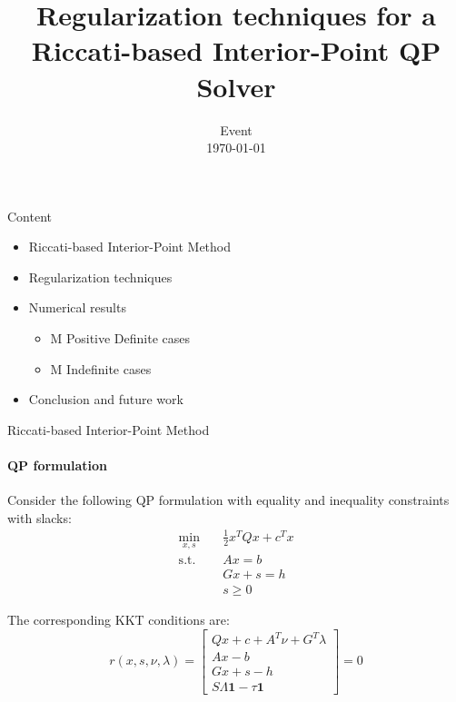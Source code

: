 \documentclass[10pt,aspectratio=1610]{beamer} %
\title[Regularization techniques for a Riccati-based Interior-Point QP Solver]{\huge Regularization techniques for a Riccati-based Interior-Point QP Solver}
\institute{Systems Control and Optimization Laboratory (syscop)}
\date[\today]{Event \\ \today }
\begin{document}
\InsertTitle

\begin{frame}{Content}

	\begin{itemize}
		\item Riccati-based Interior-Point Method
		\item Regularization techniques 
		\item Numerical results
		\begin{itemize}
			\item M Positive Definite cases
			\item M Indefinite cases
		\end{itemize}
		\item Conclusion and future work
	\end{itemize}

\end{frame}

\begin{frame}{Riccati-based Interior-Point Method}
    \framesubtitle{QP formulation}
    Consider the following QP formulation with equality and inequality constraints with slacks:
    \begin{equation}
        \begin{aligned}
            \min_{x, s} \quad & \frac{1}{2} x^T Q x + c^T x \\
            \text{s.t.} \quad & A x = b \\
            & G x + s = h \\
            & s \ge 0
        \end{aligned}
    \end{equation}

    \vspace{0.5em}
	The corresponding KKT conditions are:
    \begin{equation}
        r(x, s, \nu, \lambda) = 
        \begin{bmatrix} 
            Qx + c + A^T \nu + G^T \lambda \\
            Ax - b \\
            Gx + s - h \\
            S \Lambda \mathbf{1} - \tau \mathbf{1}
        \end{bmatrix} = 0
    \end{equation}
\end{frame}
\end{document}
